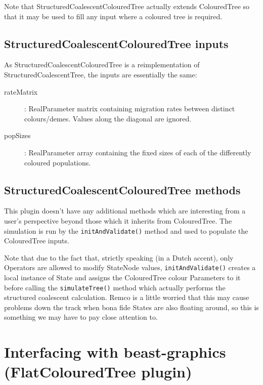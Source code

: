 \documentclass[a4paper,11pt]{paper}
\newcommand{\class}[1]{\textsf{#1}}
\newcommand{\inp}[1]{\textsf{\color{blue}#1}}
\newcommand{\code}[1]{\texttt{#1}}
\begin{document}
Note that \class{StructuredCoalescentColouredTree} actually extends
\class{ColouredTree} so that it may be used to fill any input where a
coloured tree is required.

\subsection{StructuredCoalescentColouredTree inputs}

As \class{StructuredCoalescentColouredTree} is a reimplementation of
\class{StructuredCoalescentTree}, the inputs are essentially the same:

\begin{description}
	\item[\inp{rateMatrix}]: \class{RealParameter} matrix containing
		migration rates between distinct colours/demes.  Values along
		the diagonal are ignored.
	\item[\inp{popSizes}]: \class{RealParameter} array containing the
		fixed sizes of each of the differently coloured populations.
\end{description}

\subsection{StructuredCoalescentColouredTree methods}

This plugin doesn't have any additional methods which are interesting
from a user's perspective beyond those which it inherits from
\class{ColouredTree}.  The simulation is run by the
\code{initAndValidate()} method and used to populate the
\class{ColouredTree} inputs.

Note that due to the fact that, strictly speaking (in a Dutch accent),
only \class{Operators} are allowed to modify \class{StateNode} values,
\code{initAndValidate()} creates a local instance of \class{State} and
assigns the \class{ColouredTree} colour \class{Parameters} to it
before calling the \code{simulateTree()} method which actually
performs the structured coalescent calculation.  Remco is a little
worried that this may cause problems down the track when bona fide
\class{State}s are also floating around, so this is something we may
have to pay close attention to.

\section{Interfacing with {\textsf beast-graphics} (FlatColouredTree plugin)}
\end{document}
